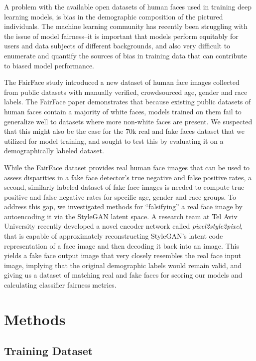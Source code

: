\documentclass[11pt, letterpaper]{article}
\begin{document}
\begin{multicols}{2}
  A problem with the available open datasets of human faces used in
  training deep learning models, is bias in the demographic
  composition of the pictured individuals. The machine learning
  community has recently been struggling with the issue of model
  fairness--it is important that models perform equitably for users
  and data subjects of different backgrounds, and also very difficult
  to enumerate and quantify the sources of bias in training data that
  can contribute to biased model performance.

  The FairFace\cite{karkkainen2019fairface} study introduced a new
  dataset of human face images collected from public datasets with
  manually verified, crowdsourced age, gender and race labels. The
  FairFace paper demonstrates that because existing public datasets of
  human faces contain a majority of white faces, models trained on
  them fail to generalize well to datasets where more non-white faces
  are present. We suspected that this might also be the case for the
  70k real and fake faces dataset that we utilized for model training,
  and sought to test this by evaluating it on a demographically
  labeled dataset.

  While the FairFace dataset provides real human face images that can
  be used to assess disparities in a fake face detector's true
  negative and false positive rates, a second, similarly labeled
  dataset of fake face images is needed to compute true positive and
  false negative rates for specific age, gender and race groups. To
  address this gap, we investigated methods for ``falsifying'' a real
  face image by autoencoding it via the StyleGAN latent space. A
  research team at Tel Aviv University recently developed a novel
  encoder network\cite{richardson2020encoding} called
  \emph{pixel2style2pixel}, that is capable of approximately
  reconstructing StyleGAN's latent code representation of a face image
  and then decoding it back into an image. This yields a fake face
  output image that very closely resembles the real face input image,
  implying that the original demographic labels would remain valid,
  and giving us a dataset of matching real and fake faces for
  scoring our models and calculating classifier fairness metrics.

  \section{Methods}

  \subsection{Training Dataset}


\end{multicols}
\end{document}
